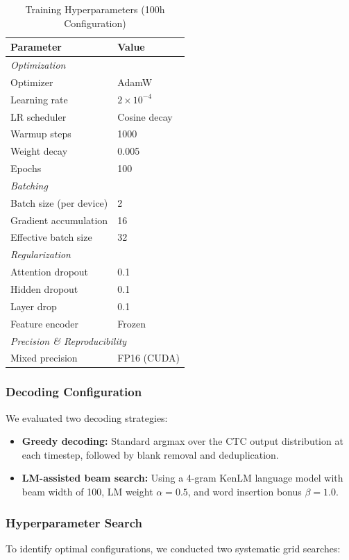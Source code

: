\documentclass[conference]{IEEEtran}
\begin{document}
\begin{table}[htbp]
\caption{Training Hyperparameters (100h Configuration)}
\centering
\begin{tabular}{ll}
\toprule
\textbf{Parameter} & \textbf{Value} \\
\midrule
\multicolumn{2}{l}{\textit{Optimization}} \\
Optimizer & AdamW \\
Learning rate & $2 \times 10^{-4}$ \\
LR scheduler & Cosine decay \\
Warmup steps & 1000 \\
Weight decay & 0.005 \\
Epochs & 100 \\
\midrule
\multicolumn{2}{l}{\textit{Batching}} \\
Batch size (per device) & 2 \\
Gradient accumulation & 16 \\
Effective batch size & 32 \\
\midrule
\multicolumn{2}{l}{\textit{Regularization}} \\
Attention dropout & 0.1 \\
Hidden dropout & 0.1 \\
Layer drop & 0.1 \\
Feature encoder & Frozen \\
\midrule
\multicolumn{2}{l}{\textit{Precision \& Reproducibility}} \\
Mixed precision & FP16 (CUDA) \\
\bottomrule
\end{tabular}
\label{tab:hyperparams}
\end{table}

\subsubsection{Decoding Configuration}
We evaluated two decoding strategies:
\begin{itemize}
    \item \textbf{Greedy decoding:} Standard argmax over the CTC output distribution at each timestep, followed by blank removal and deduplication.
    \item \textbf{LM-assisted beam search:} Using a 4-gram KenLM language model with beam width of 100, LM weight $\alpha = 0.5$, and word insertion bonus $\beta = 1.0$.
\end{itemize}

\subsubsection{Hyperparameter Search}
To identify optimal configurations, we conducted two systematic grid searches:
\end{document}
